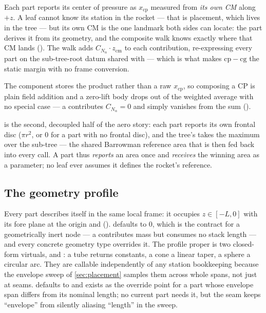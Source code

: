 \begin{designrule}
Each part reports its center of pressure as $x_{\mathrm{cp}}$ measured from \emph{its own CM}
along $+z$. A leaf cannot know its station in the rocket --- that is placement, which lives in the
tree --- but its own CM is the one landmark both sides can locate: the part derives it from its
geometry, and the composite walk knows exactly where that CM lands
(). The walk adds $C_{N_\alpha}\cdot z_{\mathrm{cm}}$ to each
contribution, re-expressing every part on the sub-tree-root datum shared with
 --- which is what makes $\mathrm{cp} - \mathrm{cg}$ the static margin with no
frame conversion.
\end{designrule}

The component stores the product  rather than a raw $x_{\mathrm{cp}}$, so
composing a CP is plain field addition and a zero-lift body drops out of the weighted average with
no special case --- a  contributes $C_{N_\alpha} = 0$ and simply vanishes from the
sum ().

 is the second, decoupled half of the aero story: each part reports its
own frontal disc ($\pi r^2$, or 0 for a part with no frontal disc), and the tree's
 takes the maximum over the sub-tree --- the shared Barrowman
reference area that is then fed back into every  call. A part thus \emph{reports} an
area once and \emph{receives} the winning area as a parameter; no leaf ever assumes it defines the
rocket's reference.

\subsection{The geometry profile}\label{sec:leaf-geometry}

Every part describes itself in the same local frame: it occupies $z \in [-L, 0]$ with its fore
plane at the origin and \zfwd{} ().  defaults to 0,
which is the contract for a geometrically inert node --- a  contributes mass but
consumes no stack length --- and every concrete geometry type overrides it. The profile proper is
two closed-form virtuals,  and : a tube
returns constants, a cone a linear taper, a sphere a circular arc. They are callable independently
of any station bookkeeping because the envelope sweep of \cref{sec:placement} samples them across
whole spans, not just at seams.  defaults to  and exists as
the override point for a part whose envelope span differs from its nominal length; no current part
needs it, but the seam keeps ``envelope'' from silently aliasing ``length'' in the sweep.

